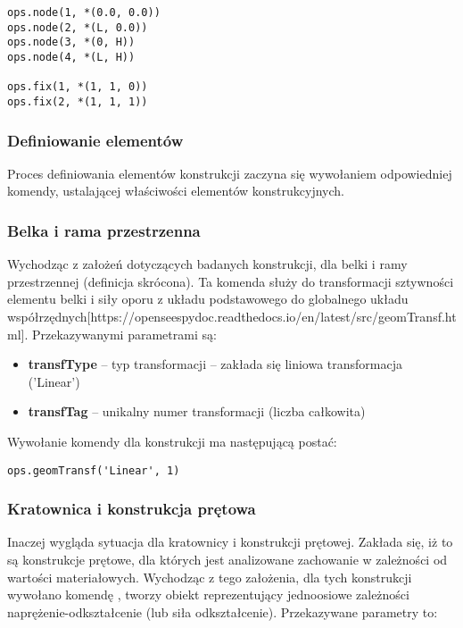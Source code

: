 \begin{lstlisting}
ops.node(1, *(0.0, 0.0))
ops.node(2, *(L, 0.0))
ops.node(3, *(0, H))
ops.node(4, *(L, H))

ops.fix(1, *(1, 1, 0))
ops.fix(2, *(1, 1, 1))
\end{lstlisting}

\subsubsection{Definiowanie elementów}

Proces definiowania elementów konstrukcji zaczyna się wywołaniem odpowiedniej komendy, ustalającej właściwości elementów konstrukcyjnych.

\subsubsection*{Belka i rama przestrzenna}

Wychodząc z założeń dotyczących badanych konstrukcji, dla belki i ramy przestrzennej  (definicja skrócona).
Ta komenda służy do transformacji sztywności elementu belki i siły oporu z układu podstawowego do globalnego układu współrzędnych[https://openseespydoc.readthedocs.io/en/latest/src/geomTransf.html].
Przekazywanymi parametrami są:

\begin{itemize}
    \item \textbf{transfType} – typ transformacji – zakłada się liniowa transformacja ('Linear')
    \item \textbf{transfTag} – unikalny numer transformacji (liczba całkowita)
\end{itemize}

Wywołanie komendy dla konstrukcji ma następującą postać:

\begin{lstlisting}
ops.geomTransf('Linear', 1)
\end{lstlisting}

\subsubsection*{Kratownica i konstrukcja prętowa}

Inaczej wygląda sytuacja dla kratownicy i konstrukcji prętowej.
Zakłada się, iż to są konstrukcje prętowe, dla których jest analizowane zachowanie w zależności od wartości materiałowych.
Wychodząc z tego założenia, dla tych konstrukcji wywołano komendę ,
tworzy obiekt reprezentujący jednoosiowe zależności naprężenie-odkształcenie (lub siła odkształcenie).
Przekazywane parametry to:

